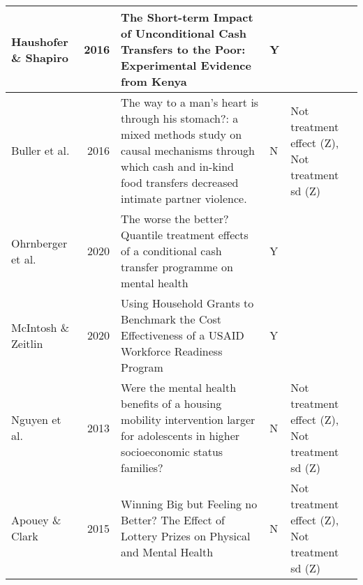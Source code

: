 \begin{table}[ht]
\begin{tabular}{lrlll}
   \hline
Haushofer \& Shapiro & 2016 & The Short-term Impact of Unconditional Cash Transfers to the Poor: Experimental Evidence from Kenya & Y &  \\ 
   \hline
Buller et al. & 2016 & The way to a man's heart is through his stomach?: a mixed methods study on causal mechanisms through which cash and in-kind food transfers decreased intimate partner violence. & N & Not treatment effect (Z), Not treatment sd (Z) \\ 
   \hline
Ohrnberger et al. & 2020 & The worse the better? Quantile treatment effects of a conditional cash transfer programme on mental health & Y &  \\ 
   \hline
McIntosh \& Zeitlin & 2020 & Using Household Grants to Benchmark the Cost Effectiveness of a USAID Workforce Readiness Program & Y &  \\ 
   \hline
Nguyen et al. & 2013 & Were the mental health benefits of a housing mobility intervention larger for adolescents in higher socioeconomic status families? & N & Not treatment effect (Z), Not treatment sd (Z) \\ 
   \hline
Apouey \& Clark & 2015 & Winning Big but Feeling no Better? The Effect of Lottery Prizes on Physical and Mental Health & N & Not treatment effect (Z), Not treatment sd (Z) \\ 
   \hline
\end{tabular}
\endgroup
\end{table}
